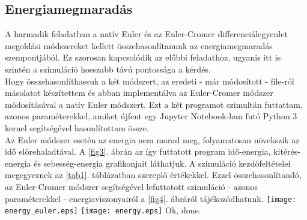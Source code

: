 \begin{multicols}{2}
\subsection{Energiamegmaradás}
A harmadik feladatban a natív Euler és az Euler-Cromer differenciálegyenlet megoldási módszereket kellett összehasonlítanunk az energiamegmaradás szempontjából. Ez szorosan kapcsolódik az előbbi feladathoz, ugyanis itt is szintén a szimuláció hosszabb távú pontossága a kérdés. \\
Hogy összehasonlíthassuk a két módszert, az eredeti - már módosított - file-ról másolatot készítettem és abban implementálva az Euler-Cromer módszer módosításával a natív Euler módszert. Ezt a két programot szimultán futtattam, azonos paraméterekkel, amiket újfent egy Jupyter Notebook-ban futó Python 3 kernel segítségével hasonlítottam össze. \\
Az Euler módszer esetén az energia nem marad meg, folyamatosan növekszik az idő előrehaladtával. A \ref{fig3}. ábrán az így futtatott program idő-energia, kitérés-energia és sebesség-energia grafikonjait láthatjuk. A szimuláció kezdőfeltételei megegyeznek az \ref{tab1}. táblázatban szereplő értékekkel. Ezzel összehasonlítandó, az Euler-Cromer módszer segítségével lefuttatott szimuláció - azonos paraméterekkel - energiaviszonyairól a \ref{fig4}. ábráról tájékozódhatunk.
{\centering\texttt{[image: energy\_euler.eps]}}
\label{fig3}
\hfill \break \hfill \break
{\centering\texttt{[image: energy.eps]}}
\label{fig4}
\hfill \break \hfill \break
Ok, done.




\end{multicols}
\hrulefill